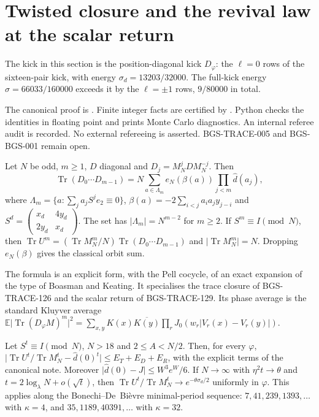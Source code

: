\section{Twisted closure and the revival law at the scalar return}
\label{sec:revival-closure-law}
The kick in this section is the position-diagonal kick \(D_\varphi\): the
\(\ell=0\) rows of the sixteen-pair kick, with energy
\(\sigma_d=13203/32000\). The full-kick energy \(\sigma=66033/160000\) exceeds
it by the \(\ell=\pm1\) rows, \(9/80000\) in total.

The canonical proof is
.
Finite integer facts are certified by
.
Python checks the identities in floating point and prints Monte Carlo
diagnostics.
An internal referee audit is recorded. No external refereeing is asserted.
BGS-TRACE-005 and BGS-BGS-001 remain open.

\begin{theorem}
\label{thm:revival-closure}
Let \(N\) be odd, \(m\ge1\), \(D\) diagonal and \(D_j=M_N^jDM_N^{-j}\). Then
\[
\operatorname{Tr}(D_0\cdots D_{m-1})
=N\sum_{a\in\Lambda_m}e_N(\beta(a))\prod_{j<m}\hat d(a_j),
\]
where
\(\Lambda_m=\{a:\sum_ja_jS^je_2\equiv0\}\),
\(\beta(a)=-2\sum_{i<j}a_ia_jy_{j-i}\) and
\(S^d=\begin{pmatrix}x_d&4y_d\\2y_d&x_d\end{pmatrix}\).
The set has \(\lvert\Lambda_m\rvert=N^{m-2}\) for \(m\ge2\).
If \(S^m\equiv I\pmod N\), then
\(\operatorname{Tr}U^m=(\operatorname{Tr}M_N^m/N)\operatorname{Tr}(D_0\cdots D_{m-1})\)
and \(\lvert\operatorname{Tr}M_N^m\rvert=N\).
Dropping \(e_N(\beta)\) gives the classical orbit sum.
\end{theorem}

The formula is an explicit form, with the Pell cocycle, of an exact expansion
of the type of Boasman and Keating. It specialises the trace closure of
BGS-TRACE-126 and the scalar return of BGS-TRACE-129. Its phase average is the
standard Kluyver average
\(\mathbb E\lvert\operatorname{Tr}(D_\varphi M)^m\rvert^2
=\sum_{x,y}K(x)\overline{K(y)}\prod_rJ_0(w_r\lvert V_r(x)-V_r(y)\rvert)\).

\begin{theorem}
\label{thm:revival-bound}
Let \(S^t\equiv I\pmod N\), \(N>18\) and \(2\le A<N/2\). Then, for every
\(\varphi\),
\(\lvert\operatorname{Tr}U^t/\operatorname{Tr}M_N^t-\hat d(0)^t\rvert\le E_T+E_D+E_R\),
with the explicit terms of the canonical note. Moreover
\(\lvert\hat d(0)-J\rvert\le W^3e^W/6\).
If \(N\to\infty\) with \(\eta^2t\to\theta\) and
\(t=2\log_\lambda N+o(\sqrt t)\), then
\(\operatorname{Tr}U^t/\operatorname{Tr}M_N^t\to e^{-\theta\sigma_d/2}\)
uniformly in \(\varphi\).
This applies along the Bonechi--De~Bi\`evre minimal-period sequence:
\(7,41,239,1393,\dots\) with \(\kappa=4\), and \(35,1189,40391,\dots\) with
\(\kappa=32\).
\end{theorem}

